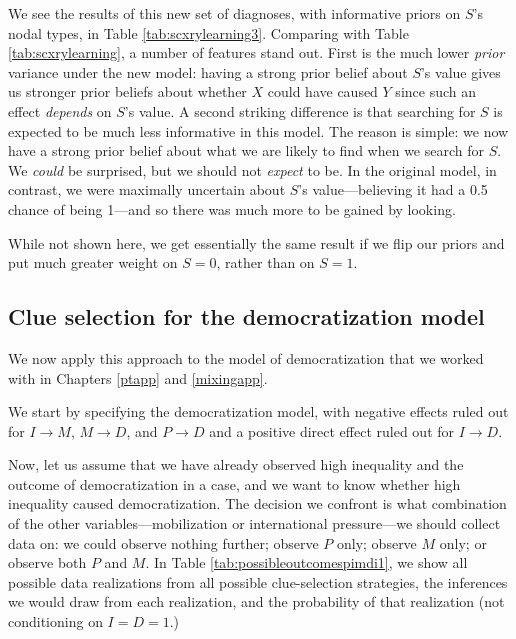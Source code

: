 \documentclass[
  12pt,
]{book}
\begin{document}
We see the results of this new set of diagnoses, with informative priors on \(S\)'s nodal types, in Table \ref{tab:scxrylearning3}. Comparing with Table \ref{tab:scxrylearning}, a number of features stand out. First is the much lower \emph{prior} variance under the new model: having a strong prior belief about \(S\)'s value gives us stronger prior beliefs about whether \(X\) could have caused \(Y\) since such an effect \emph{depends} on \(S\)'s value. A second striking difference is that searching for \(S\) is expected to be much less informative in this model. The reason is simple: we now have a strong prior belief about what we are likely to find when we search for \(S\). We \emph{could} be surprised, but we should not \emph{expect} to be. In the original model, in contrast, we were maximally uncertain about \(S\)'s value---believing it had a 0.5 chance of being 1---and so there was much more to be gained by looking.

While not shown here, we get essentially the same result if we flip our priors and put much greater weight on \(S=0\), rather than on \(S=1\).

\hypertarget{clue-selection-for-the-democratization-model}{%
\subsection{Clue selection for the democratization model}\label{clue-selection-for-the-democratization-model}}

We now apply this approach to the model of democratization that we worked with in Chapters \ref{ptapp} and \ref{mixingapp}.

We start by specifying the democratization model, with negative effects ruled out for \(I \rightarrow M\), \(M \rightarrow D\), and \(P \rightarrow D\) and a positive direct effect ruled out for \(I \rightarrow D\).

Now, let us assume that we have already observed high inequality and the outcome of democratization in a case, and we want to know whether high inequality caused democratization. The decision we confront is what combination of the other variables---mobilization or international pressure---we should collect data on: we could observe nothing further; observe \(P\) only; observe \(M\) only; or observe both \(P\) and \(M\). In Table \ref{tab:possibleoutcomespimdi1}, we show all possible data realizations from all possible clue-selection strategies, the inferences we would draw from each realization, and the probability of that realization (not conditioning on \(I=D=1\).)
\end{document}
